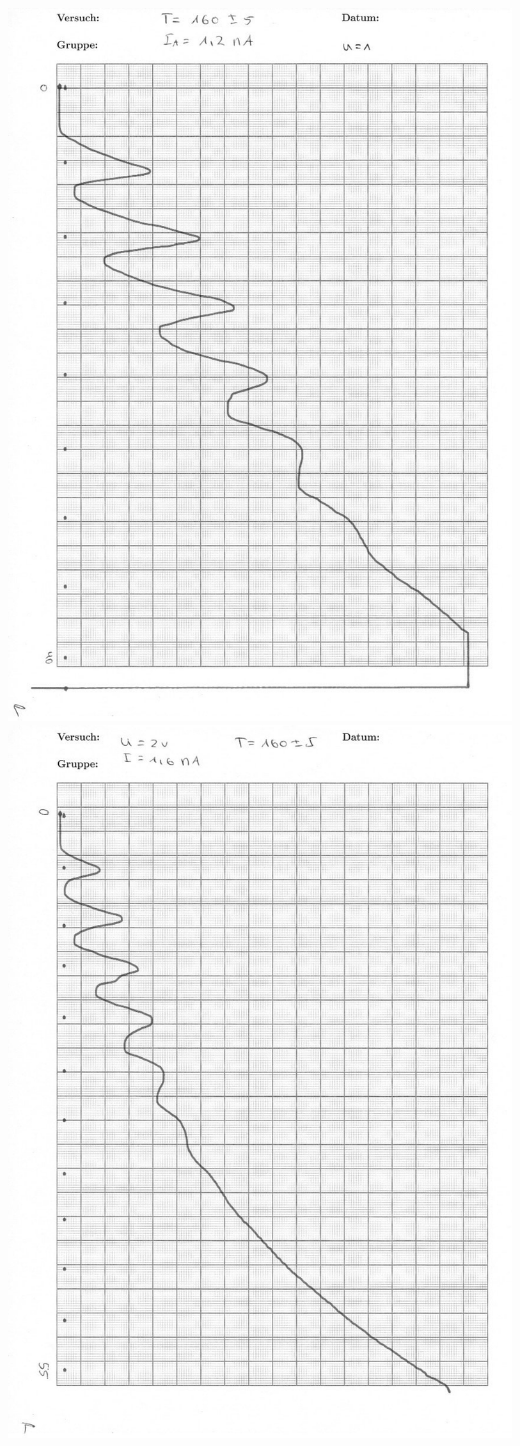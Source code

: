 \vfill\null
\newpage
\null\vfill
\includegraphics[width=0.9\linewidth]{content/messung/anhang/3b.jpg}
\vfill\null
\newpage
\null\vfill
\includegraphics[width=0.9\linewidth]{content/messung/anhang/4a.jpg}

